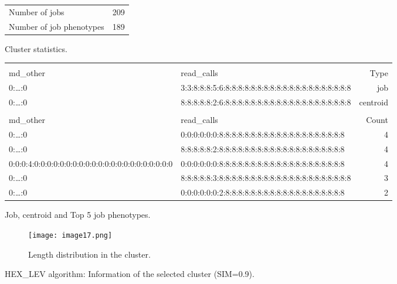 \documentclass{jhps}
\begin{document}
\begin{cluster}
	\begin{subtable}{\textwidth}
		\centering
		\begin{tabular}{ll}
			Number of jobs & 209 \\
			Number of job phenotypes & 189 \\
		\end{tabular}
		\caption{Cluster statistics.}
		\label{cluster:use_case:hex_lev:stats}
	\end{subtable}
	\medskip
	\begin{subtable}{\textwidth}
		\centering
		\begin{tiny}
			\begin{tabular}{ll|r}
				\rowcolor{tblhead}
				\multicolumn{2}{l|}{Hexadecimal coding} & \\
				\rowcolor{tblhead}
				md\_other                                           &  read\_calls                                           & Type     \\
				\hline
				0:\dots:0                                           &  3:3:8:8:8:5:6:8:8:8:8:8:8:8:8:8:8:8:8:8:8:8:8:8:8:8:8 & job      \\
				0:\dots:0                                           &  8:8:8:8:8:2:6:8:8:8:8:8:8:8:8:8:8:8:8:8:8:8:8:8:8:8:8 & centroid \\
				\multicolumn{3}{l}{}                                \\
				\rowcolor{tblhead}      md\_other                   &  read\_calls                                           & Count    \\
				\hline
				0:\dots:0                                           &  0:0:0:0:0:0:8:8:8:8:8:8:8:8:8:8:8:8:8:8:8:8:8:8:8:8   & 4        \\
				0:\dots:0                                           &  8:8:8:8:8:2:8:8:8:8:8:8:8:8:8:8:8:8:8:8:8:8:8:8:8:8   & 4        \\
				0:0:0:4:0:0:0:0:0:0:0:0:0:0:0:0:0:0:0:0:0:0:0:0:0:0 &  0:0:0:0:0:0:8:8:8:8:8:8:8:8:8:8:8:8:8:8:8:8:8:8:8:8   & 4        \\
				0:\dots:0                                           &  8:8:8:8:8:3:8:8:8:8:8:8:8:8:8:8:8:8:8:8:8:8:8:8:8:8:8 & 3        \\
				0:\dots:0                                           &  0:0:0:0:0:0:2:8:8:8:8:8:8:8:8:8:8:8:8:8:8:8:8:8:8:8   & 2        \\
			\end{tabular}
		\end{tiny}
		\caption{Job, centroid and Top 5 job phenotypes.}
		\label{cluster:use_case:hex_lev:top_jobs}
	\end{subtable}
	\medskip
	\begin{subfigure}{\textwidth}
		\centering
		\texttt{[image: image17.png]}
		\caption{Length distribution in the cluster.}
		\label{cluster:use_case:hex_lev:length}
	\end{subfigure}
	\caption{HEX\_LEV algorithm: Information of the selected cluster (SIM=0.9).}
	\label{cluster:use_case:hex_lev}
\end{cluster}
\end{document}
